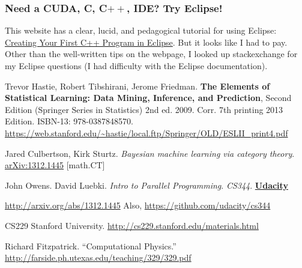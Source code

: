\documentclass[10pt]{amsart}
\begin{document}
\begin{multicols*}{2}
\subsubsection{Need a CUDA, C, C$++$, IDE?  Try Eclipse!}

This website has a clear, lucid, and pedagogical tutorial for using Eclipse: \href{https://www.fayewilliams.com/2011/06/28/creating-your-first-c-program-in-eclipse/}{	
Creating Your First C++ Program in Eclipse}.  But it looks like I had to pay.  Other than the well-written tips on the webpage, I looked up stackexchange for my Eclipse questions (I had difficulty with the Eclipse documentation).  




\end{multicols*}
\begin{thebibliography}{9}
Trevor Hastie, Robert Tibshirani, Jerome Friedman.   \textbf{The Elements of Statistical Learning: Data Mining, Inference, and Prediction}, Second Edition (Springer Series in Statistics) 2nd ed. 2009. Corr. 7th printing 2013 Edition.  ISBN-13: 978-0387848570.  \url{https://web.stanford.edu/~hastie/local.ftp/Springer/OLD/ESLII_print4.pdf}

Jared Culbertson, Kirk Sturtz.  \emph{Bayesian machine learning via category theory}.  \href{http://arxiv.org/abs/1312.1445}{arXiv:1312.1445} [math.CT]

John Owens.  David Luebki.  \emph{Intro to Parallel Programming}.  \emph{CS344}.  \textbf{\href{https://www.udacity.com/}{Udacity}}  
  
\url{http://arxiv.org/abs/1312.1445} Also, \url{https://github.com/udacity/cs344}  

CS229 Stanford University.  \url{http://cs229.stanford.edu/materials.html}


Richard Fitzpatrick.  ``Computational Physics.''  \url{http://farside.ph.utexas.edu/teaching/329/329.pdf}




\end{thebibliography}
\end{document}
